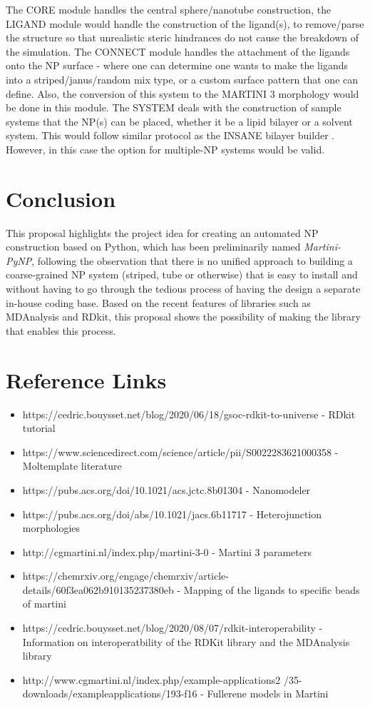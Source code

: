 \documentclass[12pt]{article}
\begin{document}
The CORE module handles the central sphere/nanotube construction, the LIGAND module would handle the construction of the ligand(s), to remove/parse
the structure so that unrealistic steric hindrances do not cause the breakdown of the simulation. The CONNECT module handles the attachment of the ligands
onto the NP surface - where one can determine one wants to make the ligands into a striped/janus/random mix type, or a custom surface pattern that one can define. Also,
the conversion of this system to the MARTINI 3 morphology would be done in this module. The SYSTEM deals with the construction of sample systems that the NP(s) can be placed, whether it be a lipid bilayer or a solvent system. This would follow similar protocol as the INSANE bilayer builder \cite{INSANE}. However, in this case the option for multiple-NP systems would be valid.
\section{Conclusion}
This proposal highlights the project idea for creating an automated NP construction based on Python, which has been preliminarily named \emph{Martini-PyNP},
following the observation that there is no unified approach to building a coarse-grained NP system (striped, tube or otherwise) that is easy to install and without having to
go through the tedious process of having the design a separate in-house coding base. Based on the recent features of libraries such as MDAnalysis and RDkit, this proposal shows the possibility
of making the library that enables this process. 
\section{Reference Links}
\begin{itemize}
\item https://cedric.bouysset.net/blog/2020/06/18/gsoc-rdkit-to-universe - RDkit tutorial
\item https://www.sciencedirect.com/science/article/pii/S0022283621000358 - Moltemplate literature
\item https://pubs.acs.org/doi/10.1021/acs.jctc.8b01304 - Nanomodeler
\item https://pubs.acs.org/doi/abs/10.1021/jacs.6b11717 - Heterojunction morphologies 
\item http://cgmartini.nl/index.php/martini-3-0 - Martini 3 parameters
\item https://chemrxiv.org/engage/chemrxiv/article-details/60f3ea062b910135237380eb - Mapping of the ligands to specific beads of martini
\item https://cedric.bouysset.net/blog/2020/08/07/rdkit-interoperability - Information on interoperatbility of the RDKit library and the MDAnalysis library
\item http://www.cgmartini.nl/index.php/example-applications2
  /35-downloads/exampleapplications/193-f16 - Fullerene models in Martini
\end{itemize}



\end{document}
